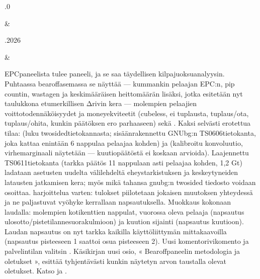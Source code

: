 \documentclass[letterpaper,10pt,finnish]{sphinxmanual}
\begin{document}
\begin{savenotes}
\begin{longtable}{}
\begin{varwidth}[t]{}
.0
\sphinxbeforeendvarwidth
\end{varwidth}%
&\begin{varwidth}[t]{}
.2026
\sphinxbeforeendvarwidth
\end{varwidth}%
&\begin{varwidth}[t]{}
\sphinxAtStartPar
EPC\sphinxhyphen{}paneelista tulee \sphinxhyphen{}paneeli, ja se saa täydellisen kilpajuoksuanalyysin. Puhtaassa bearoff\sphinxhyphen{}asemassa se näyttää — kummankin pelaajan EPC:n, pip countin, wastagen ja keskimääräisen heittomäärän lisäksi, jotka esitetään nyt taulukkona etumerkillisen Δ\sphinxhyphen{}rivin kera — molempien pelaajien voittotodennäköisyydet ja money\sphinxhyphen{}ekviteetit (cubeless, ei tuplausta, tuplaus/ota, tuplaus/ohita, kunkin päätöksen ero parhaaseen) sekä . Kaksi selvästi erotettua tilaa:  (luku two\sphinxhyphen{}sided\sphinxhyphen{}tietokannasta; sisäänrakennettu GNUbg:n TS\sphinxhyphen{}06\sphinxhyphen{}06\sphinxhyphen{}tietokanta, joka kattaa enintään 6 nappulaa pelaajaa kohden) ja  (kalibroitu konvoluutio, virhemarginaali näytetään — kuutiopäätöstä ei koskaan arvioida). Laajennettu TS\sphinxhyphen{}06\sphinxhyphen{}11\sphinxhyphen{}tietokanta (tarkka päätös 11 nappulaan asti pelaajaa kohden, 1,2 Gt) ladataan asetusten uudelta \sphinxhyphen{}välilehdeltä eheystarkistuksen ja keskeytyneiden latausten jatkamisen kera; myös mikä tahansa gnubg:n two\sphinxhyphen{}sided \sphinxhyphen{}tiedosto voidaan osoittaa.  harjoittelua varten: tulokset piilotetaan jokaisen muutoksen yhteydessä ja ne paljastuvat vyöhyke kerrallaan napsautuksella. Muokkaus kokonaan laudalla: molempien kotikenttien nappulat, vuorossa oleva pelaaja (napsautus ulosotto/pistetilanne\sphinxhyphen{}suorakulmioon) ja kuution sijainti (napsautus kuutioon). Laudan napsautus on nyt tarkka kaikilla käyttöliittymän mittakaavoilla (napsautus pisteeseen 1 saattoi osua pisteeseen 2). Uusi komentorivikomento  ja palvelintilan valitsin . Käsikirjan uusi osio, « Bearoff\sphinxhyphen{}paneelin metodologia ja oletukset », esittää tyhjentävästi kunkin näytetyn arvon taustalla olevat oletukset. Katso {\hyperref[\detokenize{manuel:panneau-epc}]{}} ja {\hyperref[\detokenize{manuel:epc-methodologie}]{}}.
\sphinxbeforeendvarwidth
\end{varwidth}%
\\
\sphinxbottomrule
\end{longtable}
\sphinxtableafterendhook
\sphinxatlongtableend
\end{savenotes}
\end{document}
